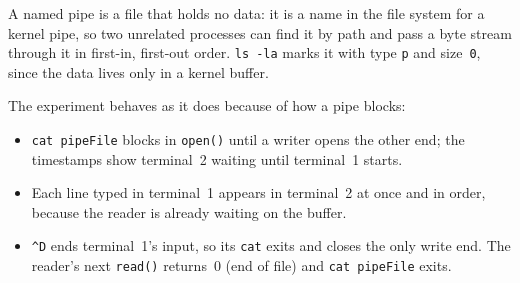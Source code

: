 
A named pipe is a file that holds no data: it is a name in the file system for
a kernel pipe, so two unrelated processes can find it by path and pass a byte
stream through it in first-in, first-out order. \texttt{ls -la} marks it with
type \texttt{p} and size~\texttt{0}, since the data lives only in a kernel
buffer.

The experiment behaves as it does because of how a pipe blocks:
\begin{itemize}
  \item \texttt{cat pipeFile} blocks in \texttt{open()} until a writer opens
    the other end; the timestamps show terminal~2 waiting until terminal~1
    starts.
  \item Each line typed in terminal~1 appears in terminal~2 at once and in
    order, because the reader is already waiting on the buffer.
  \item \texttt{\^{}D} ends terminal~1's input, so its \texttt{cat} exits and
    closes the only write end. The reader's next \texttt{read()} returns~0
    (end of file) and \texttt{cat pipeFile} exits.
\end{itemize}
